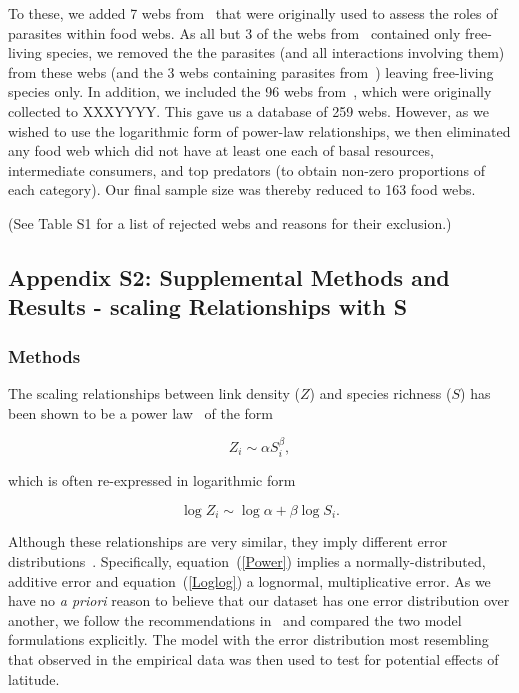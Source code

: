 \documentclass[12pt]{article}
\begin{document}
  To these, we added 7 webs from~\citet{Dunne2013} that were originally used to assess the roles
  of parasites within food webs. As all but 3 of the webs from~\citet{GlobalWeb} contained only
  free-living species, we removed the the parasites (and all interactions involving them) from
  these webs (and the 3 webs containing parasites from~\citet{GlobalWeb}) leaving free-living 
  species only. In addition, we included the 96 webs from~\citet{Brose2006}, which were originally
  collected to XXXYYYY. This gave us a database of 259 webs. However, as we wished to use the
  logarithmic form of power-law relationships, we then eliminated any food web which did not have
  at least one each of basal resources, intermediate consumers, and top predators (to obtain non-zero
  proportions of each category). Our final sample size was thereby reduced to 163 food webs.



 (See Table S1 for a list of rejected webs and reasons for their
  exclusion.) 

\subsection*{Appendix S2: Supplemental Methods and Results - scaling Relationships with S}

  \subsubsection*{Methods}

    The scaling relationships between link density ($Z$) and species richness ($S$)
    has been shown to be a power law~\citep{Riede2010} of the form 

    \begin{equation}
    \label{Power}
    Z_{i} \sim \alpha S_{i}^{\beta}  ,
    \end{equation}

    \noindent which is often re-expressed in logarithmic form 

    \begin{equation}
    \label{Loglog}
    \log{Z_{i}} \sim \log{\alpha} + \beta\log{S_{i}}  .
    \end{equation}

    \noindent Although these relationships are very similar, they imply different error distributions~\citep{Xiao2011}.
    Specifically, equation~(\ref{Power}) implies a normally-distributed, additive error and equation~(\ref{Loglog}) a lognormal,
    multiplicative error. As we have no \emph{a priori} reason to believe that our dataset has one error distribution
    over another, we follow the recommendations in~\citet{Xiao2011} and compared the two
    model formulations explicitly. The model with the error distribution most resembling that observed in the empirical
    data was then used to test for potential effects of latitude.
\end{document}
